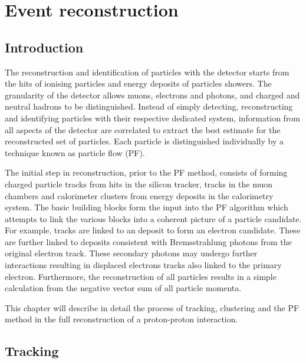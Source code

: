 \chapter{Event reconstruction}\label{chap:reconstruction}


\section{Introduction}

The reconstruction and identification of particles with the \CMS detector starts from the hits of ionising particles and energy deposits of particles showers. The granularity of the \CMS detector allows muons, electrons and photons, and charged and neutral hadrons to be distinguished. Instead of simply detecting, reconstructing and identifying particles with their respective dedicated system, information from all aspects of the detector are correlated to extract the best estimate for the reconstructed set of particles. Each particle is distinguished individually by a technique known as particle flow (PF).

The initial step in reconstruction, prior to the PF method, consists of
forming charged particle tracks from hits in the silicon tracker, tracks in
the muon chambers and calorimeter clusters from energy deposits in the
calorimetry system. The basic building blocks form the input into the PF
algorithm which attempts to link the various blocks into a coherent picture of
a particle candidate. For example, tracks are linked to an \ECAL deposit to
form an electron candidate. These are further linked to \ECAL deposits consistent
with Bremsstrahlung photons from the original electron track. These secondary photons may undergo further interactions resulting in displaced electrons tracks also linked to the primary electron. Furthermore, the reconstruction of all particles results in a simple \ptmiss calculation from the negative vector sum of all particle momenta.

This chapter will describe in detail the process of tracking, clustering and
the PF method in the full reconstruction of a proton-proton interaction.


\section{Tracking}

